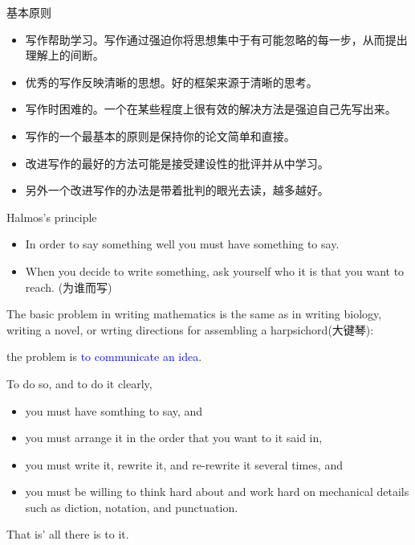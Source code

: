 \documentclass[12pt]{ctexbeamer}
\newcommand{\blue}[1]{\textcolor{blue}{#1}}
\begin{document}
\begin{frame}{基本原则}

\begin{itemize}
	\item  写作帮助学习。写作通过强迫你将思想集中于有可能忽略的每一步，从而提出理解上的间断。
	\item 优秀的写作反映清晰的思想。好的框架来源于清晰的思考。
	\item  写作时困难的。一个在某些程度上很有效的解决方法是强迫自己先写出来。
	\item 写作的一个最基本的原则是保持你的论文简单和直接。
	\item 改进写作的最好的方法可能是接受建设性的批评并从中学习。
	\item 另外一个改进写作的办法是带着批判的眼光去读，越多越好。
\end{itemize}
\end{frame}

\begin{frame}{Halmos's principle}
	\begin{itemize}
		\item  In order to say something well you must have something to say. 
		\item When you decide to write something, ask yourself who it is that you want to reach. (为谁而写)
	\end{itemize}

\vspace{8pt}
The basic problem in writing mathematics is the same as in writing biology, writing a novel, or wrting directions for assembling a harpsichord(大键琴): 
\begin{center}
the problem is \blue{to communicate an idea}.
\end{center}
To do so, and to do it clearly, 
\begin{itemize}
	\item you must have somthing to say, and 
	\item you must arrange it in the order that you want to it said in, 
	\item you must write it, rewrite it, and re-rewrite it  several times, and 
	\item you must be willing to think hard about and work hard on mechanical details such as diction, notation, and punctuation.
	\end{itemize}
That is' all there is to it.
\end{frame}
	
	
\end{document}
